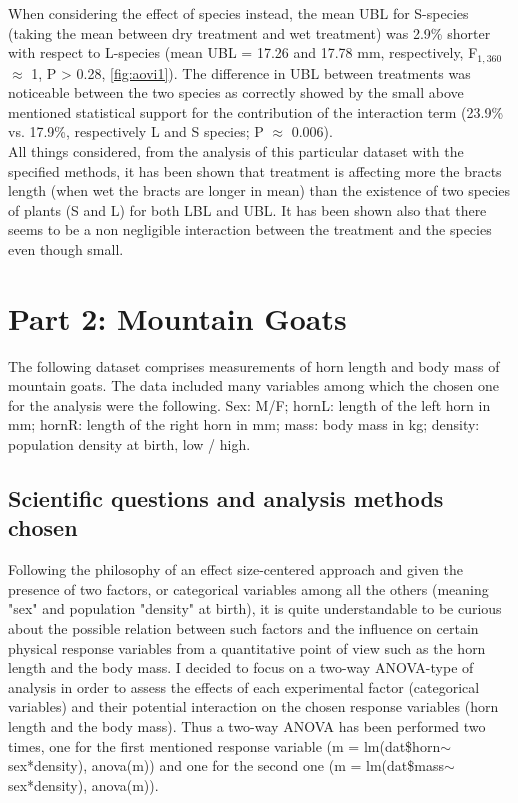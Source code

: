 \documentclass{article}
\begin{document}
When considering the effect of species instead, the mean UBL for S-species (taking the mean between dry treatment and wet treatment) was 2.9\% shorter with respect to L-species (mean UBL = 17.26 and 17.78 mm, respectively, F$_{1,360}$ $\approx$ 1, P > 0.28, \autoref{fig:aovi1}).
The difference in UBL between treatments was noticeable between the two species as correctly showed by the small above mentioned statistical support for the contribution of the interaction term (23.9\% vs. 17.9\%, respectively L and S species; P $\approx$ 0.006).\\
\fi
All things considered, from the analysis of this particular dataset with the specified methods, it has been shown that treatment is affecting more the bracts length (when wet the bracts are longer in mean) than the existence of two species of plants (S and L) for both LBL and UBL. It has been shown also that there seems to be a non negligible interaction between the treatment and the species even though small.

\section{Part 2: Mountain Goats}
The following dataset comprises measurements of horn length and body mass of mountain goats. The data included many variables among which the chosen one for the analysis were the following.
Sex: M/F; hornL: length of the left horn in mm; hornR: length of the right horn in mm; mass: body mass in kg; density: population density at birth, low / high. 

\subsection{Scientific questions and analysis methods chosen}
Following the philosophy of an effect size-centered approach and given the presence of two factors, or categorical variables among all the others (meaning "sex" and population "density" at birth), it is quite understandable to be curious about the possible relation between such factors and the influence on certain physical response variables from a quantitative point of view such as the horn length and the body mass.
I decided to focus on a two-way ANOVA-type of analysis in order to assess the effects of each experimental factor (categorical variables) and their potential interaction on the chosen response variables (horn length and the body mass). Thus a two-way ANOVA has been performed two times, one for the first mentioned response variable (m = lm(dat\$horn$\sim$sex*density),
anova(m)) and one for the second one (m = lm(dat\$mass$\sim$sex*density), anova(m)).
\end{document}
